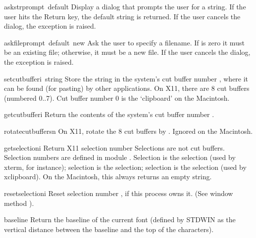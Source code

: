\begin{funcdesc}{askstr}{prompt\, default}
Display a dialog that prompts the user for a string.
If the user hits the Return key, the default string is returned.
If the user cancels the dialog, the
exception is raised.
\end{funcdesc}

\begin{funcdesc}{askfile}{prompt\, default\, new}
Ask the user to specify a filename.
If
is zero it must be an existing file; otherwise, it must be a new file.
If the user cancels the dialog, the
exception is raised.
\end{funcdesc}

\begin{funcdesc}{setcutbuffer}{i\, string}
Store the string in the system's cut buffer number
,
where it can be found (for pasting) by other applications.
On X11, there are 8 cut buffers (numbered 0..7).
Cut buffer number 0 is the `clipboard' on the Macintosh.
\end{funcdesc}

\begin{funcdesc}{getcutbuffer}{i}
Return the contents of the system's cut buffer number
.
\end{funcdesc}

\begin{funcdesc}{rotatecutbuffers}{n}
On X11, rotate the 8 cut buffers by
.
Ignored on the Macintosh.
\end{funcdesc}

\begin{funcdesc}{getselection}{i}
Return X11 selection number
Selections are not cut buffers.
Selection numbers are defined in module
.
Selection  is the
selection (used by
xterm,
for instance);
selection  is the
selection; selection  is the
selection (used by
xclipboard).
On the Macintosh, this always returns an empty string.
\end{funcdesc}

\begin{funcdesc}{resetselection}{i}
Reset selection number
,
if this process owns it.
(See window method
).
\end{funcdesc}

\begin{funcdesc}{baseline}{}
Return the baseline of the current font (defined by STDWIN as the
vertical distance between the baseline and the top of the
characters).
\end{funcdesc}

